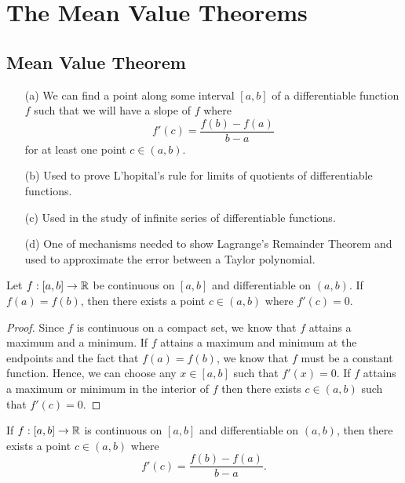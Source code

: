 
\section{The Mean Value Theorems}

\subsection{Mean Value Theorem}

\begin{enumerate}
    \item[(a)] We can find a point along some interval \( [a,b]  \) of a differentiable function \( f  \) such that we will have a slope of \( f  \) where 
        \[  f'(c) = \frac{ f(b) - f(a)  }{  b - a  }  \]
        for at least one point \( c \in (a,b) \).
    \item[(b)] Used to prove L'hopital's rule for limits of quotients of differentiable functions.
    \item[(c)] Used in the study of infinite series of differentiable functions.
    \item[(d)] One of mechanisms needed to show Lagrange's Remainder Theorem and used to approximate the error between a Taylor polynomial.
\end{enumerate}

\begin{theorem}
        Let \( f : [a,b] \to \mathbb{R}  \) be continuous on \( [a,b]  \) and differentiable on \( (a,b)  \). If \( f(a) = f(b) \), then there exists a point \( c \in (a,b)  \) where \( f'(c) = 0  \). 
    \end{theorem}


\begin{proof}
    Since \( f  \) is continuous on a compact set, we know that \( f  \) attains a maximum and a minimum. If \( f  \) attains a maximum and minimum at the endpoints and the fact that \( f(a) = f(b)  \), we know that \( f  \) must be a constant function. Hence, we can choose any \( x \in [a,b]  \) such that \( f'(x) = 0  \). If \( f  \) attains a maximum or minimum in the interior of \( f  \) then there exists \( c \in (a,b)  \) such that \( f'(c) = 0  \).
\end{proof}

\begin{theorem}
        If \( f: [a,b] \to \mathbb{R}  \) is continuous on \( [a,b]  \) and differentiable on \( (a,b)  \), then there exists a point \( c \in (a,b)  \) where 
        \[  f'(c) = \frac{ f(b) - f(a)  }{ b - a  }. \]
    \end{theorem}

